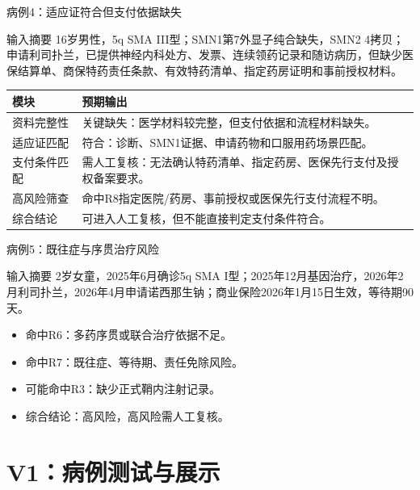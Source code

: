 \documentclass{beamer}
\newcommand{\tagbad}{\textcolor{red!70!black}{高风险}}
\begin{document}
\begin{frame}[fragile]{病例4：适应证符合但支付依据缺失}
  \begin{block}{输入摘要}
    16岁男性，5q SMA III型；SMN1第7外显子纯合缺失，SMN2 4拷贝；申请利司扑兰，已提供神经内科处方、发票、连续领药记录和随访病历，但缺少医保结算单、商保特药责任条款、有效特药清单、指定药房证明和事前授权材料。\cite{saito2025safety}
  \end{block}
  \vspace{0.5em} %
  
  \footnotesize 
  \begin{tabularx}{\textwidth}{l X}
    \toprule
    模块 & 预期输出 \\
    \midrule
    资料完整性 & 关键缺失：医学材料较完整，但支付依据和流程材料缺失。 \\
    适应证匹配 & 符合：诊断、SMN1证据、申请药物和口服用药场景匹配。 \\
    支付条件匹配 & 需人工复核：无法确认特药清单、指定药房、医保先行支付及授权备案要求。 \\
    高风险筛查 & 命中R8指定医院/药房、事前授权或医保先行支付流程不明。 \\
    综合结论 & 可进入人工复核，但不能直接判定支付条件符合。 \\
    \bottomrule
  \end{tabularx}
\end{frame}

\begin{frame}[fragile]{病例5：既往症与序贯治疗风险}
  \begin{block}{输入摘要}
    2岁女童，2025年6月确诊5q SMA I型；2025年12月基因治疗，2026年2月利司扑兰，2026年4月申请诺西那生钠；商业保险2026年1月15日生效，等待期90天。\cite{okubo2026outcomes}
  \end{block}
  \begin{itemize}
    \item 命中R6：多药序贯或联合治疗依据不足。
    \item 命中R7：既往症、等待期、责任免除风险。
    \item 可能命中R3：缺少正式鞘内注射记录。
    \item 综合结论：\tagbad，高风险需人工复核。
  \end{itemize}
\end{frame}

\section{V1：病例测试与展示}
\end{document}
